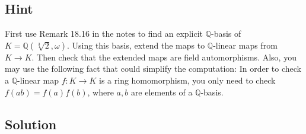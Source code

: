 \documentclass[fleqn]{article}
\begin{document}
        \subsection{Hint}
        First use Remark 18.16 in the notes to find an explicit $\mathbb{Q}$-basis of $K = \mathbb{Q}\left(\sqrt[3]{2}, \omega\right)$.  Using this basis, extend the maps to $\mathbb{Q}$-linear maps from $K \to K$.  Then check that the extended maps are field automorphisms.  Also, you may use the following fact that could simplify the computation:  In order to check a $\mathbb{Q}$-linear map $f: K \to K$ is a ring homomorphism, you only need to check $f(ab) = f(a) f(b)$, where $a, b$ are elements of a $\mathbb{Q}$-basis.
        
        \subsection{Solution}
        
    
\end{document}
